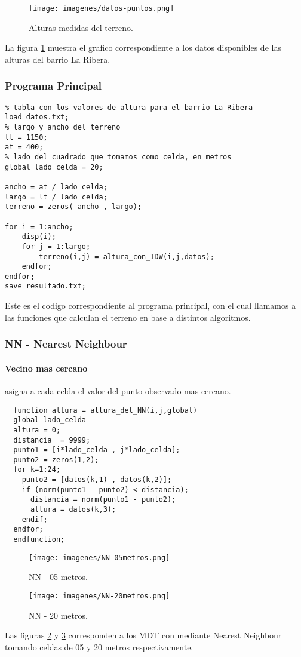 \documentclass{article}
\begin{document}
\begin{figure}[H]
  \texttt{[image: imagenes/datos-puntos.png]}
  \centering
  \caption{Alturas medidas del terreno.}
  \label{fig:datos-2d}
\end{figure}

La figura \ref{fig:datos-2d} muestra el grafico correspondiente a los
datos disponibles de las alturas del barrio La Ribera.

\subsubsection{Programa Principal}
\begin{verbatim}
% tabla con los valores de altura para el barrio La Ribera
load datos.txt;
% largo y ancho del terreno 
lt = 1150;
at = 400;
% lado del cuadrado que tomamos como celda, en metros 
global lado_celda = 20;

ancho = at / lado_celda;
largo = lt / lado_celda;
terreno = zeros( ancho , largo);

for i = 1:ancho;
    disp(i);
    for j = 1:largo;
        terreno(i,j) = altura_con_IDW(i,j,datos);
    endfor;
endfor;
save resultado.txt;
\end{verbatim}
Este es el codigo correspondiente al programa principal, con el cual
llamamos a las funciones que calculan el terreno en base a distintos
algoritmos. 

\subsubsection{NN - Nearest Neighbour}
\paragraph{Vecino mas cercano} asigna a cada celda el valor del punto
observado mas cercano.
\begin{verbatim}
  function altura = altura_del_NN(i,j,global)
  global lado_celda
  altura = 0;
  distancia  = 9999;
  punto1 = [i*lado_celda , j*lado_celda];
  punto2 = zeros(1,2);
  for k=1:24;
    punto2 = [datos(k,1) , datos(k,2)];
    if (norm(punto1 - punto2) < distancia);
      distancia = norm(punto1 - punto2);
      altura = datos(k,3);
    endif;
  endfor;
  endfunction;
\end{verbatim}

\begin{figure}[H]
  \centering
  \texttt{[image: imagenes/NN-05metros.png]}
  \caption{NN - 05 metros.}
  \label{fig:mdt-nn05}
\end{figure}
\begin{figure}[h!]
  \centering
  \texttt{[image: imagenes/NN-20metros.png]}
  \caption{NN - 20 metros.}
  \label{fig:mdt-nn20}
\end{figure}
Las figuras \ref{fig:mdt-nn05} y \ref{fig:mdt-nn20} corresponden a los
MDT con mediante Nearest Neighbour tomando celdas de 05 y 20 metros respectivamente. 
\end{document}
